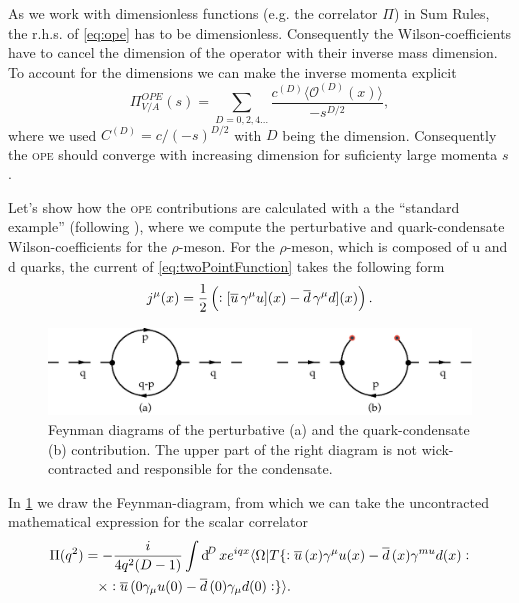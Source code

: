 \documentclass[../../index.tex]{subfiles}
\begin{document}
As we work with dimensionless functions (e.g. the correlator $\Pi$) in Sum Rules, the r.h.s. of
\cref{eq:ope} has to be dimensionless. Consequently the Wilson-coefficients have
to cancel the dimension of the operator with their inverse mass dimension. To
account for the dimensions we can make the inverse momenta explicit
\begin{equation}
  \Pi_{V/A}^{OPE}(s) = \sum_{D=0,2,4\dots} \frac{c^{(D)} \langle \mathcal{O}^{(D)}(x) \rangle}{-s^{D/2}},
\end{equation}
where we used $C^{(D)}=c/(-s)^{D/2}$ with $D$ being the dimension. Consequently
the \textsc{ope} should converge with increasing dimension for suficienty large momenta
$s$.

Let's show how the \textsc{ope} contributions are calculated with a the ``standard
example'' (following \cite{Pascual1986}), where we compute the perturbative and
quark-condensate Wilson-coefficients for the $\rho$-meson. For the $\rho$-meson,
which is composed of u and d quarks, the current of \cref{eq:twoPointFunction}
takes the following form
\begin{equation}
  j^\mu(x) = \frac{1}{2}\left(:[\overline{u}\, \gamma^\mu u](x) - \overline{d}\, \gamma^\mu d](x)\right).
\end{equation}
\begin{figure}
  \centering
  \includegraphics[width=\textwidth]{./images/condensateFeynmanDiagram.eps}
  \caption{Feynman diagrams of the perturbative (a) and the quark-condensate (b)
    contribution. The upper part of the right diagram is not wick-contracted and
    responsible for the condensate.}
  \label{fig:OPEFeynmanDiagram}
\end{figure}
In \cref{fig:OPEFeynmanDiagram} we draw the Feynman-diagram, from which we can
take the uncontracted mathematical expression for the scalar correlator
\begin{equation}
  \begin{split}
    \Pi(q^2) &= - \frac{i}{4 q^2 (D -1)} \int \dif^D x e^{iqx} \langle \Omega | T \{:\anti{u}(x) \gamma^\mu u(x) - \anti{d}(x) \gamma^{mu} d(x): \\
    &\quad\times :\anti{u}(0 \gamma_\mu u(0) - \anti{d}(0)\gamma_\mu d(0): \}
    \rangle.
  \end{split}
\end{equation}
\end{document}
